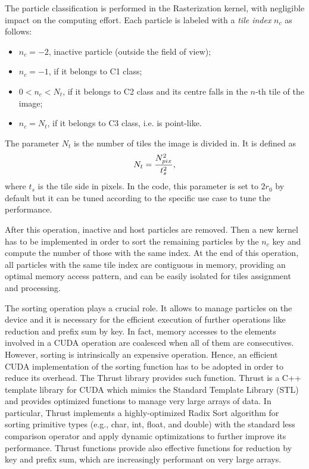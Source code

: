 \documentclass[11pt]{article}
\begin{document}
The particle classification is performed in the Rasterization kernel, with negligible impact
on the computing effort. Each particle is labeled
with a {\it tile index} $n_c$ as follows:
\begin{itemize}
\item 
$n_c = -2$, inactive particle (outside the field of view);
\item
$n_c = -1$, if it belongs to C1 class; 
\item
$0 < n_c < N_t$, if it belongs to C2 class and its centre falls in the $n$-th tile of the image;  
\item
$n_c = N_t$, if it belongs to C3 class, i.e. is point-like.
\end{itemize}
The parameter $N_t$ is the number of tiles the image is divided in. It is defined as
\begin{equation}
N_t = {N_{pix}^2\over t_s^2},   
\end{equation}
where $t_s$ is the tile side in pixels. In the code, this parameter is set to $2r_0$ 
by default but it can be tuned according to the specific use case to tune the performance. 

After this operation, inactive and host particles are removed. Then a new kernel has to be implemented in order to sort the remaining particles by the $n_c$ key and compute the number of those with the same index. 
At the end of this operation, all particles with the same tile index are contiguous in memory, providing an optimal memory access pattern, and can be easily isolated for tiles assignment and processing.

The sorting operation plays a crucial role. It allows to manage particles on the 
device and it is necessary for the efficient execution of further operations like 
reduction and prefix sum by key. In fact, memory accesses to the elements involved 
in a CUDA operation are coalesced when all of them are consecutives. However, sorting 
is intrinsically an expensive operation. Hence, an efficient CUDA implementation of
the sorting function has to be adopted in order to reduce its overhead. 
The Thrust library \cite{thrusturl} provides such function. Thrust is a C++ template library 
for CUDA which mimics the Standard Template Library (STL) and provides 
optimized functions to manage very large arrays of data. In particular, Thrust 
implements a highly-optimized Radix Sort algorithm for sorting primitive types
(e.g., char, int, float, and double) with the standard less comparison operator and 
apply dynamic optimizations to further improve its performance.
Thrust functions provide also effective functions for reduction by key and prefix sum, which are 
increasingly performant on very large arrays.
\end{document}
